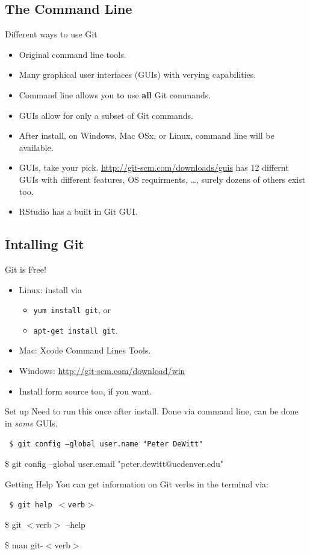 \subsection{The Command Line}
\begin{frame}[t]{Different ways to use Git}
  \begin{itemize}
    \item Original command line tools.
    \item Many graphical user interfaces (GUIs) with verying capabilities.

    \item Command line allows you to use {\bf all} Git commands.
    \item GUIs allow for only a subset of Git commands.

    \item After install, on Windows, Mac OSx, or Linux, command line will be
      available.
    \item GUIs, take your pick. \url{http://git-scm.com/downloads/guis} has 12
      differnt GUIs with different features, OS requirments, \ldots, surely
      dozens of others exist too.
    \item RStudio has a built in Git GUI.
  \end{itemize}
\end{frame}

\subsection{Intalling Git}
\begin{frame}[t]{Git is Free!}
  \begin{itemize}
    \item Linux: install via 
      \begin{itemize}
        \item {\tt yum install git}, or
        \item {\tt apt-get install git}.
      \end{itemize}
    \item Mac: Xcode Command Lines Tools.
    \item Windows: \url{http://git-scm.com/download/win}
    \item Install form source too, if you want.
  \end{itemize}
\end{frame}

\begin{frame}[t]{Set up}
  Need to run this once after install.  Done via command line, can be done in
  {\it some} GUIs.

  {\tt
    \$ git config --global user.name "Peter DeWitt"

    \$ git config --global user.email "peter.dewitt@ucdenver.edu" 
  } 
\end{frame}

\begin{frame}[t]{Getting Help}
  You can get information on Git verbs in the terminal via:

  {\tt
    \$ git help $<$verb$>$

    \$ git $<$verb$>$ --help

    \$ man git-$<$verb$>$ 
  } 
\end{frame}
